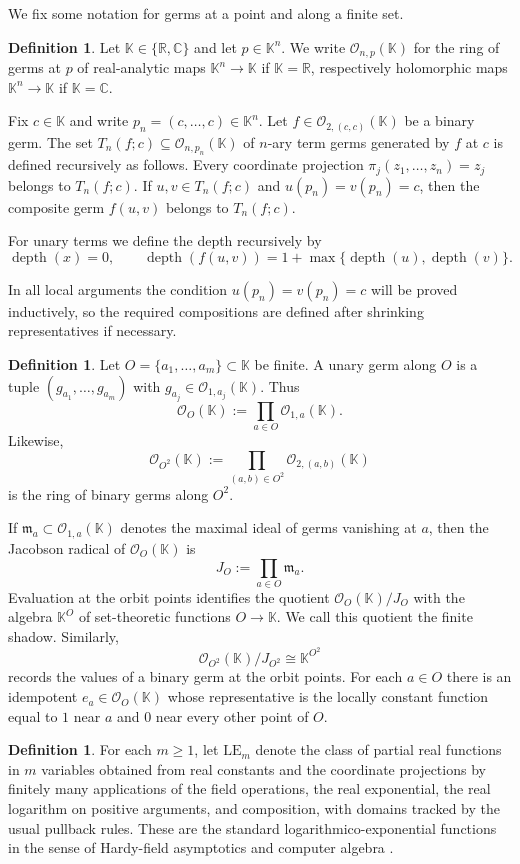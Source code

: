 \documentclass[11pt]{amsart}
\numberwithin{equation}{section}
\theoremstyle{remark}
\theoremstyle{definition}
\newtheorem{definition}[theorem]{Definition}
\newcommand{\C}{\mathbb{C}}
\newcommand{\R}{\mathbb{R}}
\newcommand{\K}{\mathbb{K}}
\newcommand{\LE}{\mathrm{LE}}
\newcommand{\Oc}{\mathcal{O}}
\newcommand{\mc}{\mathfrak m}
\begin{document}
We fix some notation for germs at a point and along a finite set.

\begin{definition}
Let $\K\in\{\R,\C\}$ and let $p\in\K^n$. We write $\Oc_{n,p}(\K)$ for the ring of germs at $p$ of real-analytic maps $\K^n\to\K$ if $\K=\R$, respectively holomorphic maps $\K^n\to\K$ if $\K=\C$.

Fix $c\in\K$ and write $p_n=(c,\dots,c)\in\K^n$. Let $f\in \Oc_{2,(c,c)}(\K)$ be a binary germ. The set $T_n(f;c)\subseteq \Oc_{n,p_n}(\K)$ of $n$-ary term germs generated by $f$ at $c$ is defined recursively as follows. Every coordinate projection $\pi_j(z_1,\dots,z_n)=z_j$ belongs to $T_n(f;c)$. If $u,v\in T_n(f;c)$ and $u(p_n)=v(p_n)=c$, then the composite germ $f(u,v)$ belongs to $T_n(f;c)$.

For unary terms we define the depth recursively by
\[
\operatorname{depth}(x)=0,\qquad \operatorname{depth}(f(u,v))=1+\max\{\operatorname{depth}(u),\operatorname{depth}(v)\}.
\]
\end{definition}

In all local arguments the condition $u(p_n)=v(p_n)=c$ will be proved inductively, so the required compositions are defined after shrinking representatives if necessary.

\begin{definition}
Let $O=\{a_1,\dots,a_m\}\subset \K$ be finite. A unary germ along $O$ is a tuple $(g_{a_1},\dots,g_{a_m})$ with $g_{a_j}\in \Oc_{1,a_j}(\K)$. Thus
\[
\Oc_O(\K):=\prod_{a\in O}\Oc_{1,a}(\K).
\]
Likewise,
\[
\Oc_{O^2}(\K):=\prod_{(a,b)\in O^2}\Oc_{2,(a,b)}(\K)
\]
is the ring of binary germs along $O^2$.
\end{definition}

If $\mc_a\subset \Oc_{1,a}(\K)$ denotes the maximal ideal of germs vanishing at $a$, then the Jacobson radical of $\Oc_O(\K)$ is
\[
J_O:=\prod_{a\in O}\mc_a.
\]
Evaluation at the orbit points identifies the quotient $\Oc_O(\K)/J_O$ with the algebra $\K^O$ of set-theoretic functions $O\to\K$. We call this quotient the finite shadow. Similarly,
\[
\Oc_{O^2}(\K)/J_{O^2}\cong \K^{O^2}
\]
records the values of a binary germ at the orbit points. For each $a\in O$ there is an idempotent $e_a\in \Oc_O(\K)$ whose representative is the locally constant function equal to $1$ near $a$ and $0$ near every other point of $O$.

\begin{definition}
For each $m\geq 1$, let $\LE_m$ denote the class of partial real functions in $m$ variables obtained from real constants and the coordinate projections by finitely many applications of the field operations, the real exponential, the real logarithm on positive arguments, and composition, with domains tracked by the usual pullback rules. These are the standard logarithmico-exponential functions in the sense of Hardy-field asymptotics and computer algebra \cite{Hardy1910,Rosenlicht1983,Aschenbrenner2017,Shackell1990,Strzebonski2019}.
\end{definition}
\end{document}

